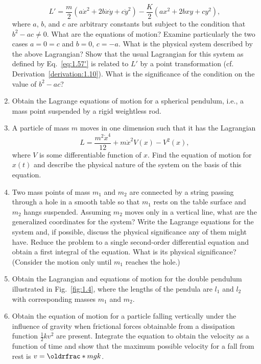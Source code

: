 \begin{enumerate}[resume]
    \begin{equation*}
        L'=\frac{m}{2}\left(a\dot{x}^2+2b\dot{x}\dot{y}+c\dot{y}^2\right)-\frac{K}{2}\left(ax^2+2bxy+cy^2\right),
    \end{equation*}
    where \(a\), \(b\), and \(c\) are arbitrary constants but subject to the condition that \(b^2-ac\ne0\). What are the equations of motion? Examine particularly the two cases \(a=0=c\) and \(b=0\), \(c=-a\). What is the physical system described by the above Lagrangian? Show that the usual Lagrangian for this system as defined by Eq.~\eqref{eq:1.57'} is related to \(L'\) by a point transformation (cf. Derivation~\ref{derivation:1.10}). What is the significance of the condition on the value of \(b^2-ac\)?
    \item Obtain the Lagrange equations of motion for a spherical pendulum, i.e., a mass point suspended by a rigid weightless rod.
    \item\label{exercise:1.20} A particle of mass \(m\) moves in one dimension such that it has the Lagrangian
    \begin{equation*}
        L=\frac{m^2\dot{x}^4}{12}+m\dot{x}^2V\left(x\right)-V^2\left(x\right),
    \end{equation*}
    where \(V\) is some differentiable function of \(x\). Find the equation of motion for \(x\left(t\right)\) and describe the physical nature of the system on the basis of this equation.
    \item Two mass points of mass \(m_1\) and \(m_2\) are connected by a string passing through a hole in a smooth table so that \(m_1\) rests on the table surface and \(m_2\) hangs suspended. Assuming \(m_2\) moves only in a vertical line, what are the generalized coordinates for the system? Write the Lagrange equations for the system and, if possible, discuss the physical significance any of them might have. Reduce the problem to a single second-order differential equation and obtain a first integral of the equation. What is its physical significance? (Consider the motion only until \(m_1\) reaches the hole.)
    \item Obtain the Lagrangian and equations of motion for the double pendulum illustrated in Fig.~\ref{fig:1.4}, where the lengths of the pendula are \(l_1\) and \(l_2\) with corresponding masses \(m_1\) and \(m_2\).
    \item Obtain the equation of motion for a particle falling vertically under the influence of gravity when frictional forces obtainable from a dissipation function \(\frac{1}{2}kv^2\) are present. Integrate the equation to obtain the velocity as a function of time and show that the maximum possible velocity for a fall from rest is \(v=\rfrac{mg}{k}\).

\end{enumerate}
